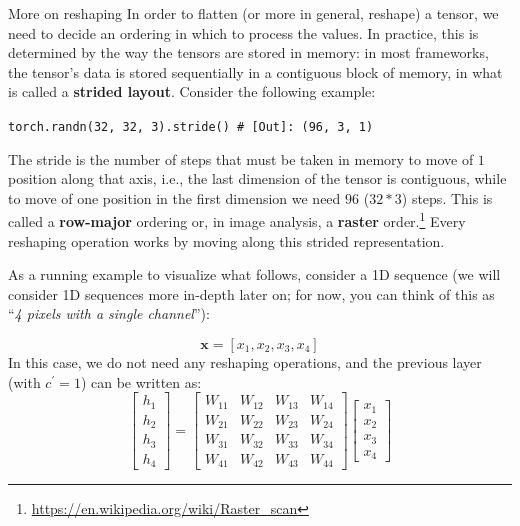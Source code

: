 \begin{supportbox}{More on reshaping}
%
In order to flatten (or more in general, reshape) a tensor, we need to decide an ordering in which to process the values. In practice, this is determined by the way the tensors are stored in memory: in most frameworks, the tensor's data is stored sequentially in a contiguous block of memory, in what is called a \textbf{strided layout}. Consider the following example:

\vspace{1em}
\begin{center}
\footnotesize
\texttt{torch.randn(32, 32, 3).stride() # [Out]: (96, 3, 1)}
\end{center}
\vspace{1em}

The stride is the number of steps that must be taken in memory to move of $1$ position along that axis, i.e., the last dimension of the tensor is contiguous, while to move of one position in the first dimension we need $96$ ($32*3$) steps. This is called a \textbf{row-major} ordering or, in image analysis, a \textbf{raster} order.\footnote{\url{https://en.wikipedia.org/wiki/Raster_scan}} Every reshaping operation works by moving along this strided representation.
%
\end{supportbox}

As a running example to visualize what follows, consider a 1D sequence (we will consider 1D sequences more in-depth later on; for now, you can think of this as “\textit{4 pixels with a single channel}”):

$$
\mathbf{x} = \left[x_1, x_2, x_3, x_4\right]
$$
%
In this case, we do not need any reshaping operations, and the previous layer (with $c^\prime = 1$) can be written as:
%
$$
\begin{bmatrix} h_1 \\ h_2 \\ h_3 \\ h_4 \end{bmatrix}=\begin{bmatrix}W_{11} & W_{12} & W_{13} & W_{14} \\ W_{21} & W_{22} & W_{23} & W_{24} \\ W_{31} & W_{32} & W_{33} & W_{34} \\ W_{41} & W_{42} & W_{43} & W_{44} \end{bmatrix} \begin{bmatrix} x_1 \\ x_2 \\ x_3 \\ x_4 \end{bmatrix}
$$

